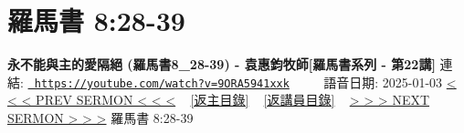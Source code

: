 \documentclass{book}
\begin{document}
\section{羅馬書 8:28-39}
\label{sec:9ORA5941xxk}
\textbf{永不能與主的愛隔絕 (羅馬書8\_28-39) - 袁惠鈞牧師[羅馬書系列 - 第22講]}
\newline
\newline
連結: \href{https://youtube.com/watch?v=9ORA5941xxk}{\texttt{ https://youtube.com/watch?v=9ORA5941xxk}} ~~~~ 語音日期: 2025-01-03 
\newline
\newline
\hyperref[sec:KIOzsSOi_wU]{< < < PREV SERMON < < <}
~
\hyperlink{toc}{[返主目錄]}
~
\hyperref[ch:preacher10]{[返講員目錄]}
~
\hyperref[sec:w_ajWsBZ9eQ]{> > > NEXT SERMON > > >}
\newline
\newline
羅馬書 8:28-39
\newline
\end{document}
